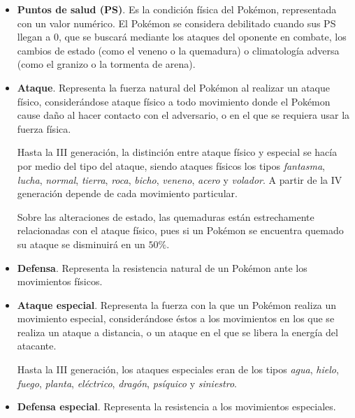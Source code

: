 \documentclass[a4paper, 11pt, titlepage]{article}
\begin{document}
    \begin{itemize}
        \item \textbf{Puntos de salud (PS)}. Es la condición física del Pokémon, representada 
        con un valor numérico. El Pokémon se considera debilitado cuando sus PS llegan a 0, que 
        se buscará mediante los ataques del oponente en combate, los cambios de estado (como 
        el veneno o la quemadura) o climatología adversa (como el granizo o la tormenta de arena).
        
        \item \textbf{Ataque}. Representa la fuerza natural del Pokémon al realizar un ataque físico, 
        considerándose ataque físico a todo movimiento donde el Pokémon cause daño al hacer contacto 
        con el adversario, o en el que se requiera usar la fuerza física.

        Hasta la III generación, la distinción entre ataque físico y especial se hacía por medio 
        del tipo del ataque, siendo ataques físicos los tipos \textit{fantasma}, \textit{lucha}, 
        \textit{normal}, \textit{tierra}, \textit{roca}, \textit{bicho}, \textit{veneno}, 
        \textit{acero} y \textit{volador}. A partir de la IV generación depende de cada movimiento 
        particular.

        Sobre las alteraciones de estado, las quemaduras están estrechamente relacionadas con el 
        ataque físico, pues si un Pokémon se encuentra quemado su ataque se disminuirá en un $50\%$.
        
        \item \textbf{Defensa}. Representa la resistencia natural de un Pokémon ante los movimientos 
        físicos.
        
        \item \textbf{Ataque especial}. Representa la fuerza con la que un Pokémon realiza un movimiento 
        especial, considerándose éstos a los movimientos en los que se realiza un ataque a distancia, o 
        un ataque en el que se libera la energía del atacante.

        Hasta la III generación, los ataques especiales eran de los tipos \textit{agua}, \textit{hielo},
        \textit{fuego}, \textit{planta}, \textit{eléctrico}, \textit{dragón}, \textit{psíquico} y 
        \textit{siniestro}.
        
        \item \textbf{Defensa especial}. Representa la resistencia a los movimientos especiales.
        

\end{itemize}
\end{document}
